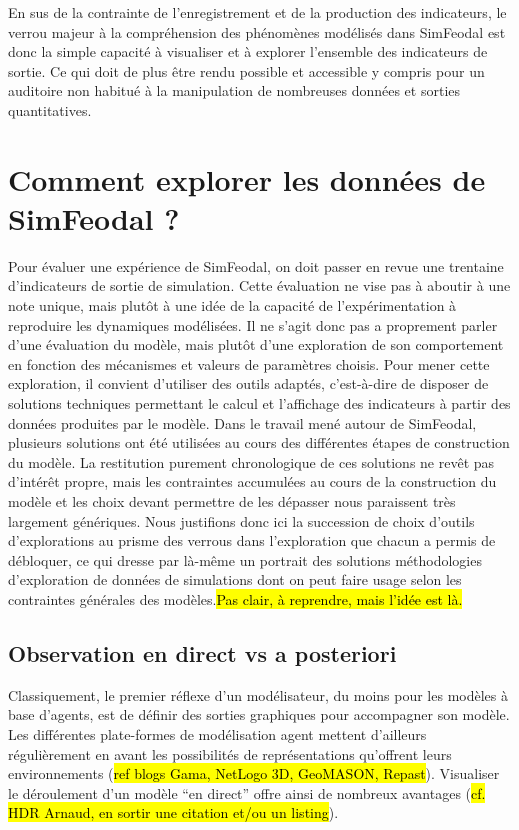 	En sus de la contrainte de l'enregistrement et de la production des indicateurs, le verrou majeur à la compréhension des phénomènes modélisés dans SimFeodal est donc la simple capacité à visualiser et à explorer l'ensemble des indicateurs de sortie.
	Ce qui doit de plus être rendu possible et accessible y compris pour un auditoire non habitué à la manipulation de nombreuses données et sorties quantitatives.
	
\clearpage
\section{Comment explorer les données de SimFeodal ?}

	Pour évaluer une expérience de SimFeodal, on doit passer en revue une trentaine d'indicateurs de sortie de simulation.
	Cette évaluation ne vise pas à aboutir à une note unique, mais plutôt à une idée de la capacité de l'expérimentation à reproduire les dynamiques modélisées.
	Il ne s'agit donc pas a proprement parler d'une évaluation du modèle, mais plutôt d'une exploration de son comportement en fonction des mécanismes et valeurs de paramètres choisis.
	Pour mener cette exploration, il convient d'utiliser des outils adaptés, c'est-à-dire de disposer de solutions techniques permettant le calcul et l'affichage des indicateurs à partir des données produites par le modèle.
	Dans le travail mené autour de SimFeodal, plusieurs solutions ont été utilisées au cours des différentes étapes de construction du modèle.
	La restitution purement chronologique de ces solutions ne revêt pas d'intérêt propre, mais les contraintes accumulées au cours de la construction du modèle et les choix devant permettre de les dépasser nous paraissent très largement génériques.
	Nous justifions donc ici la succession de choix d'outils d'explorations au prisme des verrous dans l'exploration que chacun a permis de débloquer, ce qui dresse par là-même un portrait des solutions méthodologies d'exploration de données de simulations dont on peut faire usage selon les contraintes générales des modèles.\hl{Pas clair, à reprendre, mais l'idée est là.}
	
	\subsection{Observation en direct vs a posteriori}

	Classiquement, le premier réflexe d'un modélisateur, du moins pour les modèles à base d'agents, est de définir des sorties graphiques pour accompagner son modèle.
	Les différentes plate-formes de modélisation agent mettent d'ailleurs régulièrement en avant les possibilités de représentations qu'offrent leurs environnements (\hl{ref blogs Gama, NetLogo 3D, GeoMASON, Repast}).
	Visualiser le déroulement d'un modèle ``en direct'' offre ainsi de nombreux avantages (\hl{cf. HDR Arnaud, en sortir une citation et/ou un listing}).

